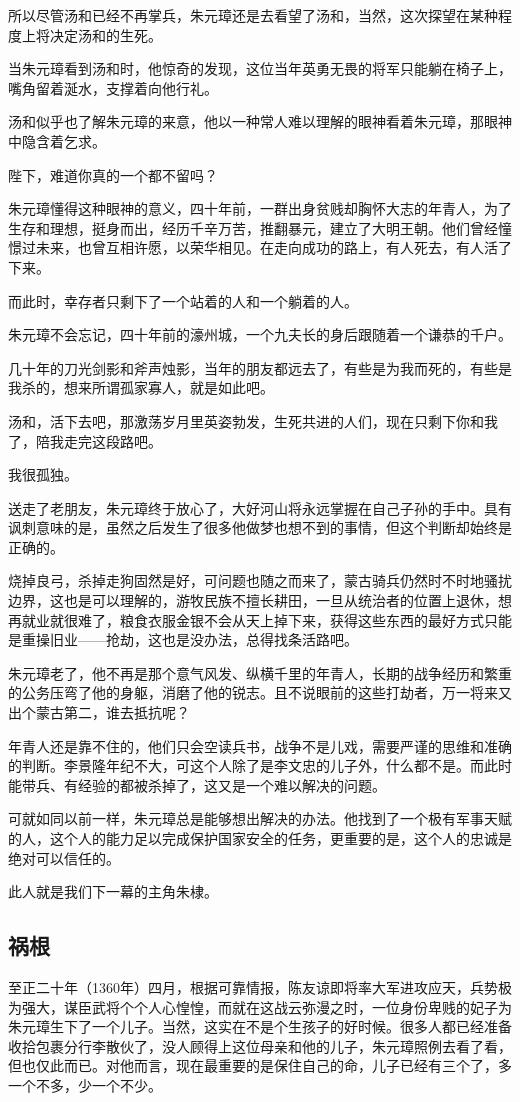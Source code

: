 \begin{multicols}{\theparacolNo}
		所以尽管汤和已经不再掌兵，朱元璋还是去看望了汤和，当然，这次探望在某种程度上将决定汤和的生死。

		当朱元璋看到汤和时，他惊奇的发现，这位当年英勇无畏的将军只能躺在椅子上，嘴角留着涎水，支撑着向他行礼。

		汤和似乎也了解朱元璋的来意，他以一种常人难以理解的眼神看着朱元璋，那眼神中隐含着乞求。

		陛下，难道你真的一个都不留吗？

		朱元璋懂得这种眼神的意义，四十年前，一群出身贫贱却胸怀大志的年青人，为了生存和理想，挺身而出，经历千辛万苦，推翻暴元，建立了大明王朝。他们曾经憧憬过未来，也曾互相许愿，以荣华相见。在走向成功的路上，有人死去，有人活了下来。

		而此时，幸存者只剩下了一个站着的人和一个躺着的人。

		朱元璋不会忘记，四十年前的濠州城，一个九夫长的身后跟随着一个谦恭的千户。

		几十年的刀光剑影和斧声烛影，当年的朋友都远去了，有些是为我而死的，有些是我杀的，想来所谓孤家寡人，就是如此吧。

		汤和，活下去吧，那激荡岁月里英姿勃发，生死共进的人们，现在只剩下你和我了，陪我走完这段路吧。

		我很孤独。

		送走了老朋友，朱元璋终于放心了，大好河山将永远掌握在自己子孙的手中。具有讽刺意味的是，虽然之后发生了很多他做梦也想不到的事情，但这个判断却始终是正确的。

		烧掉良弓，杀掉走狗固然是好，可问题也随之而来了，蒙古骑兵仍然时不时地骚扰边界，这也是可以理解的，游牧民族不擅长耕田，一旦从统治者的位置上退休，想再就业就很难了，粮食衣服金银不会从天上掉下来，获得这些东西的最好方式只能是重操旧业——抢劫，这也是没办法，总得找条活路吧。

		朱元璋老了，他不再是那个意气风发、纵横千里的年青人，长期的战争经历和繁重的公务压弯了他的身躯，消磨了他的锐志。且不说眼前的这些打劫者，万一将来又出个蒙古第二，谁去抵抗呢？

		年青人还是靠不住的，他们只会空读兵书，战争不是儿戏，需要严谨的思维和准确的判断。李景隆年纪不大，可这个人除了是李文忠的儿子外，什么都不是。而此时能带兵、有经验的都被杀掉了，这又是一个难以解决的问题。

		可就如同以前一样，朱元璋总是能够想出解决的办法。他找到了一个极有军事天赋的人，这个人的能力足以完成保护国家安全的任务，更重要的是，这个人的忠诚是绝对可以信任的。

		此人就是我们下一幕的主角朱棣。

		\subsection{祸根}
		至正二十年（1360年）四月，根据可靠情报，陈友谅即将率大军进攻应天，兵势极为强大，谋臣武将个个人心惶惶，而就在这战云弥漫之时，一位身份卑贱的妃子为朱元璋生下了一个儿子。当然，这实在不是个生孩子的好时候。很多人都已经准备收拾包裹分行李散伙了，没人顾得上这位母亲和他的儿子，朱元璋照例去看了看，但也仅此而已。对他而言，现在最重要的是保住自己的命，儿子已经有三个了，多一个不多，少一个不少。


\end{multicols}
